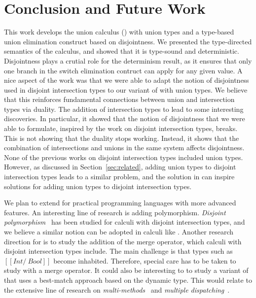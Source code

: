 \section{Conclusion and Future Work}
\label{sec:conclusion}

This work develops the union calculus (\cal) with union types and a
type-based union elimination construct based on disjointness. We presented the
type-directed semantics of the calculus, and showed that it is
type-sound and deterministic. Disjointness plays a crutial role for
the determinism result, as it ensures that only one branch in the
switch elimination contruct can apply for any given value. A nice
aspect of the work was that we were able to adapt the notion of
disjointness used in disjoint intersection types to our variant of
\name with union types. We believe that this reinforces fundamental
connections between union and intersection types via duality.  The
addition of intersection types to \name lead to some interesting
discoveries.  In particular, it showed that the notion of disjointness
that we were able to formulate, inspired by the work on disjoint
intersection types, breaks.  This is not showing that the duality stops
working. Instead, it shows that the combination of intersections
and unions in the same system affects disjointness. None of the
previous works on disjoint intersection types included union
types. However, as discussed in Section~\ref{sec:related}, adding
union types to disjoint intersection types leads to a similar problem,
and the solution in \name can inspire solutions for adding union types to
disjoint intersection types.

We plan to extend \cal for practical programming languages with more
advanced features. An interesting line of research is adding polymorphism.
\emph{Disjoint polymorphism}~\cite{alpuimdisjoint} has been studied for
calculi with disjoint intersection
types, and we believe a similar notion can be adopted in calculi like \name.
Another research direction for \cal is to study
the addition of the merge operator, which calculi with disjoint
intersection types include. The main challenge is that types such as
$[[Int /\ Bool]]$ become inhabited. 
Therefore, special care has to be taken
to study \cal with a merge operator.
It could also be interesting to to study a variant of \name that uses
a best-match approach based on the dynamic type. This would relate
to the extensive line of research on \emph{multi-methods}~\cite{Chambers92}
and \emph{multiple dispatching}~\cite{CliftonLCM2000}. 


\begin{comment}
Another domain of future interest
is to embed dynamic dispatch in \cal by defining a weak and more
expressive disjointness. Dynamic dispatch will allow type checking
more programs.
\end{comment}
